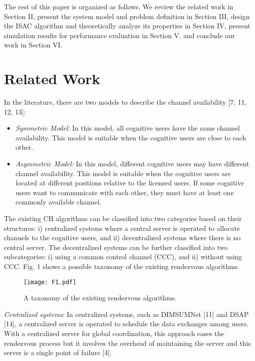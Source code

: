\documentclass[journal]{IEEEtran}
\begin{document}
\par The rest of this paper is organized as follows. We review the related work in Section II, present the system model and problem definition in Section III, design the ISAC algorithm and theoretically analyze its properties in Section IV, present simulation results for performance evaluation in Section V, and conclude our work in Section VI.

\section{Related Work}
\par In the literature, there are two models to describe the channel availability [7, 11, 12, 13]:
\begin{itemize}
\item \emph{Symmetric Model:} In this model, all cognitive users have the same channel availability. This model is suitable when the cognitive users are close to each other.
\item \emph{Asymmetric Model:} In this model, different cognitive users may have different channel availability. This model is suitable when the cognitive users are located at different positions relative to the licensed users. If some cognitive users want to communicate with each other, they must have at least one commonly available channel.
\end{itemize}
\par The existing CH algorithms can be classified into two categories based on their structures: i) centralized systems where a central server is operated to allocate channels to the cognitive users, and ii) decentralized systems where there is no central server. The decentralized systems can be further classified into two subcategories: i) using a common control channel (CCC), and ii) without using CCC. Fig. 1 shows a possible taxonomy of the existing rendezvous algorithms.
\begin{figure}
\centering
\texttt{[image: F1.pdf]}
\caption{A taxonomy of the existing rendezvous algorithms.}
\end{figure}
\par \emph{Centralized systems}: In centralized systems, such as DIMSUMNet [11] and DSAP [14], a centralized server is operated to schedule the data exchanges among users. With a centralized server for global coordination, this approach eases the rendezvous process but it involves the overhead of maintaining the server and this server is a single point of failure [4].
\end{document}
